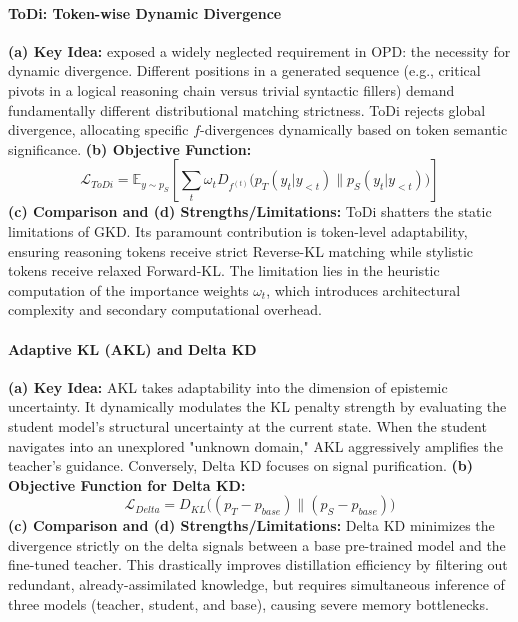 \paragraph{ToDi: Token-wise Dynamic Divergence}
\textbf{(a) Key Idea:} \citet{2505.16297} exposed a widely neglected requirement in OPD: the necessity for dynamic divergence. Different positions in a generated sequence (e.g., critical pivots in a logical reasoning chain versus trivial syntactic fillers) demand fundamentally different distributional matching strictness. ToDi rejects global divergence, allocating specific $f$-divergences dynamically based on token semantic significance.
\textbf{(b) Objective Function:}
\begin{equation}
    \mathcal{L}_{ToDi} = \mathbb{E}_{y \sim p_S} \left[ \sum_t \omega_t D_{f^{(t)}} \big( p_T(y_t|y_{<t}) \parallel p_S(y_t|y_{<t}) \big) \right]
    \label{eq:todi}
\end{equation}
\textbf{(c) Comparison and (d) Strengths/Limitations:} ToDi shatters the static limitations of GKD. Its paramount contribution is token-level adaptability, ensuring reasoning tokens receive strict Reverse-KL matching while stylistic tokens receive relaxed Forward-KL. The limitation lies in the heuristic computation of the importance weights $\omega_t$, which introduces architectural complexity and secondary computational overhead.

\paragraph{Adaptive KL (AKL) and Delta KD}
\textbf{(a) Key Idea:} AKL \citep{2410.14425} takes adaptability into the dimension of epistemic uncertainty. It dynamically modulates the KL penalty strength by evaluating the student model's structural uncertainty at the current state. When the student navigates into an unexplored "unknown domain," AKL aggressively amplifies the teacher's guidance.
Conversely, Delta KD \citep{2509.14526} focuses on signal purification.
\textbf{(b) Objective Function for Delta KD:}
\begin{equation}
    \mathcal{L}_{Delta} = D_{KL}\big( (p_T - p_{base}) \parallel (p_S - p_{base}) \big)
\end{equation}
\textbf{(c) Comparison and (d) Strengths/Limitations:} Delta KD minimizes the divergence strictly on the delta signals between a base pre-trained model and the fine-tuned teacher. This drastically improves distillation efficiency by filtering out redundant, already-assimilated knowledge, but requires simultaneous inference of three models (teacher, student, and base), causing severe memory bottlenecks.

